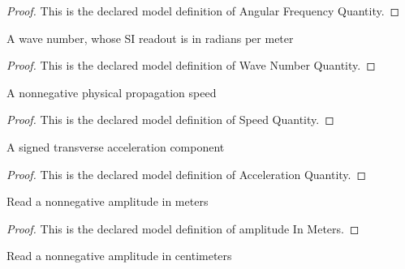 \begin{proof}
  This is the declared model definition of Angular Frequency Quantity.
\end{proof}
\begin{definition}
  \label{def:physics:phyx-mini-0240:phyxminiproblems-problemphyxmini0240-wavenumberquantity}
  A wave number, whose SI readout is in radians per meter
\end{definition}
\begin{proof}
  This is the declared model definition of Wave Number Quantity.
\end{proof}
\begin{definition}
  \label{def:physics:phyx-mini-0240:phyxminiproblems-problemphyxmini0240-speedquantity}
  A nonnegative physical propagation speed
\end{definition}
\begin{proof}
  This is the declared model definition of Speed Quantity.
\end{proof}
\begin{definition}
  \label{def:physics:phyx-mini-0240:phyxminiproblems-problemphyxmini0240-accelerationquantity}
  A signed transverse acceleration component
\end{definition}
\begin{proof}
  This is the declared model definition of Acceleration Quantity.
\end{proof}
\begin{definition}
  \label{def:physics:phyx-mini-0240:phyxminiproblems-problemphyxmini0240-amplitudeinmeters}
  Read a nonnegative amplitude in meters
\end{definition}
\begin{proof}
  This is the declared model definition of amplitude In Meters.
\end{proof}
\begin{definition}
  \label{def:physics:phyx-mini-0240:phyxminiproblems-problemphyxmini0240-amplitudeincentimeters}
  Read a nonnegative amplitude in centimeters
\end{definition}
